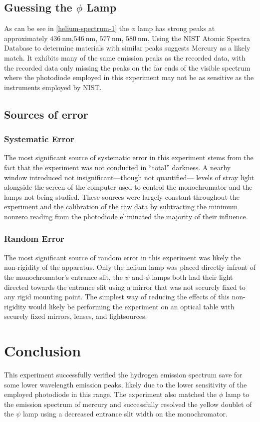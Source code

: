 \documentclass[10pt, twocolumn]{article}
\theoremstyle{definition}
\begin{document}
\subsection{Guessing the $\phi$ Lamp}
As can be see in \ref{helium-spectrum-1} the $\phi$ lamp has strong peaks at approximately
$\qty{436}{\nano\meter}$,$\qty{546}{\nano\meter}$, $\qty{577}{\nano\meter}$, $\qty{580}{\nano\meter}$. Using the
NIST Atomic Spectra Database\autocite{spectrum-db} to determine materials with similar peaks suggests Mercury as a likely
match. It exhibits many of the same emission peaks as the recorded data,
with the recorded data only missing the peaks on the far ends of the visible spectrum where the photodiode employed in
this experiment may not be as sensitive as the instruments employed by NIST.
\subsection{Sources of error}
\subsubsection{Systematic Error}
The most significant source of systematic error in this experiment stems from the fact that the experiment
was not conducted in ``total'' darkness. A nearby window introduced not insignificant---though not quantified---
levels of stray light alongside the screen of the computer used to control the monochromator and the lamps not
being studied. These sources were largely constant throughout the experiment and the calibration of the raw data by
subtracting the minimum nonzero reading from the photodiode eliminated the majority of their
influence.
\subsubsection{Random Error}
The most significant source of random error in this experiment was likely the non-rigidity of the apparatus. Only the helium
lamp was placed directly infront of the monochromator's entrance slit, the $\psi$ and $\phi$ lamps both had their light directed
towards the entrance slit using a mirror that was not securely fixed to any rigid mounting point. The simplest way of
reducing the effects of this non-rigidity would likely be performing the experiment on an optical table with securely fixed
mirrors, lenses, and lightsources.
\section{Conclusion}
This experiment successfully verified the hydrogen emission spectrum save for some lower wavelength emission peaks,
likely due to the lower sensitivity of the employed photodiode in this range. The experiment also matched the $\phi$
lamp to the emission spectrum of mercury and successfully resolved the yellow doublet of the $\psi$ lamp using a 
decreased entrance slit width on the monochromator.
\end{document}
